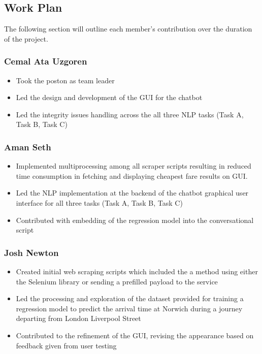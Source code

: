 \subsection{Work Plan}
The following section will outline each member's contribution over the duration of the project.
\subsubsection{Cemal Ata Uzgoren}
\begin{itemize}
    \item Took the poston as team leader
    \item Led the design and development of the GUI for the chatbot
    \item Led the integrity issues handling across the all three NLP tasks (Task A, Task B, Task C)
\end{itemize}
\subsubsection{Aman Seth}
\begin{itemize}
    \item Implemented multiprocessing among all scraper scripts resulting in reduced time consumption in fetching and displaying cheapest fare results on GUI.
    \item Led the NLP implementation at the backend of the chatbot graphical user interface for all three tasks (Task A, Task B, Task C)
    \item Contributed with embedding of the regression model into the conversational script
    
\end{itemize}
\subsubsection{Josh Newton}
\begin{itemize}
    \item Created initial web scraping scripts which included the a method using either the Selenium library or sending a prefilled payload to the service
    \item Led the processing and exploration of the dataset provided for training a regression model to predict the arrival time at Norwich during a journey departing from London Liverpool Street
    \item Contributed to the refinement of the GUI, revising the appearance based on feedback given from user testing
\end{itemize} 

